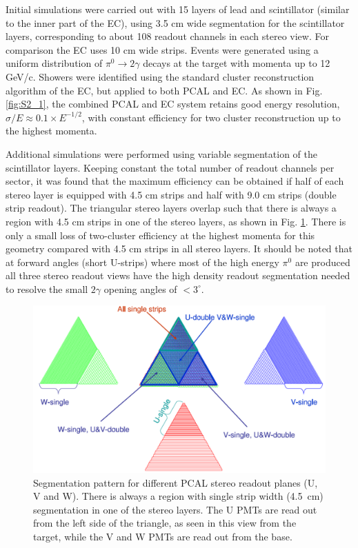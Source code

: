 Initial simulations were carried out with 15 layers of lead and scintillator (similar to the inner part of the EC), using 3.5 cm wide segmentation for the scintillator layers, corresponding to about 108 readout channels in each stereo view. For comparison the EC uses 10 cm wide strips.  Events were generated using a uniform distribution of $\pi^{0}\rightarrow 2\gamma$ decays at the target with momenta up to 12 GeV/c.  Showers were identified using the standard cluster reconstruction algorithm of the EC, but applied to both PCAL and EC. As shown in Fig. \ref{fig:S2_1}, the combined PCAL and EC system retains good energy resolution, $\sigma/E \approx 0.1 \times E^{-1/2}$, with constant efficiency for two cluster reconstruction up to the highest momenta.

Additional simulations were performed using variable segmentation of the scintillator layers. Keeping constant the total number of readout channels per sector, it was found that the maximum efficiency can be obtained if half of each stereo layer is equipped with 4.5 cm strips and half with 9.0 cm strips (double strip readout). The triangular stereo layers overlap such that there is always a region with 4.5 cm strips in one of the stereo layers, as shown in Fig. \ref{fig:S2_2}. There is only a small loss of two-cluster efficiency at the highest momenta for this geometry compared with 4.5 cm strips in all stereo layers. It should be noted that at forward angles (short U-strips) where most of the high energy $\pi^{0}$ are produced all three stereo readout views have the high density readout segmentation needed to resolve the small $2\gamma$ opening angles of $<3^{\circ}$.

\begin{figure}[hbt]
\centering
\includegraphics[width=0.95\columnwidth,keepaspectratio]{img/S2_2.png}
\caption{Segmentation pattern for different PCAL stereo readout planes (U, V and W). There is always a region with single strip width (4.5~cm) segmentation in one of the stereo layers.  The U PMTs are read out from the left side of the triangle, as seen in this view from the target, while the V and W PMTs are read out from the base.}
\label{fig:S2_2}
\end{figure}



